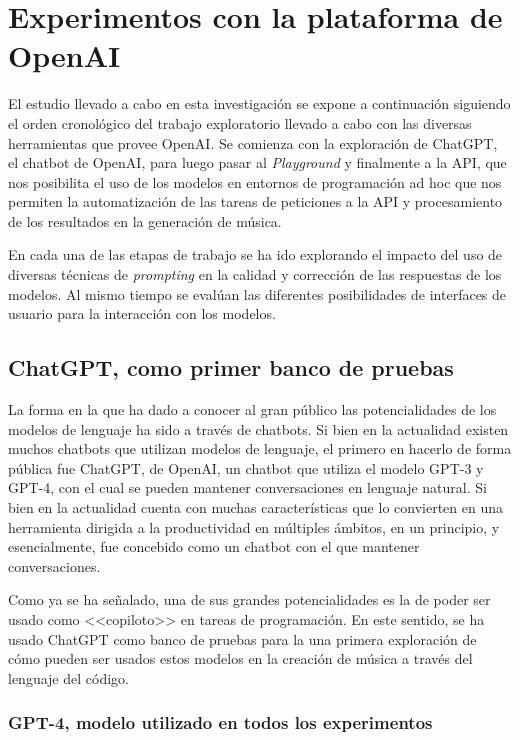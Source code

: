 
\chapter{Experimentos con la plataforma de OpenAI}

El estudio llevado a cabo en esta investigación se expone a continuación siguiendo el orden cronológico del trabajo exploratorio llevado a cabo con las diversas herramientas que provee OpenAI. Se comienza con la exploración de ChatGPT, el chatbot de OpenAI, para luego pasar al \textit{Playground} y finalmente a la API, que nos posibilita el uso de los modelos en entornos de programación ad hoc que nos permiten la automatización de las tareas de peticiones a la API y procesamiento de los resultados en la generación de música.

En cada una de las etapas de trabajo se ha ido explorando el impacto del uso de diversas técnicas de \textit{prompting} en la calidad y corrección de las respuestas de los modelos. Al mismo tiempo se evalúan las diferentes posibilidades de interfaces de usuario para la interacción con los modelos. 

\section{ChatGPT, como primer banco de pruebas}
La forma en la que ha dado a conocer al gran público las potencialidades de los modelos de lenguaje ha sido a través de chatbots. Si bien en la actualidad existen muchos chatbots que utilizan modelos de lenguaje, el primero en hacerlo de forma pública fue ChatGPT, de OpenAI, un chatbot que utiliza el modelo GPT-3 y GPT-4, con el cual se pueden mantener conversaciones en lenguaje natural. Si bien en la actualidad cuenta con muchas características que lo convierten en una herramienta dirigida a la productividad en múltiples ámbitos, en un principio, y esencialmente, fue concebido como un chatbot con el que mantener conversaciones.

Como ya se ha señalado, una de sus grandes potencialidades es la de poder ser usado como <<copiloto>> en tareas de programación. En este sentido, se ha usado ChatGPT como banco de pruebas para la una primera exploración de cómo pueden ser usados estos modelos en la creación de música a través del lenguaje del código.

\subsection{GPT-4, modelo utilizado en todos los experimentos}


